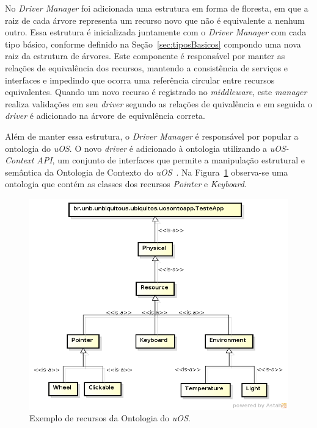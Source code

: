 No \emph{Driver Manager} foi adicionada uma estrutura em forma de floresta, em que a raiz de cada árvore representa um recurso novo que não é equivalente a nenhum outro. Essa estrutura é inicializada juntamente com o \emph{Driver Manager} com cada tipo básico, conforme definido na Seção~\ref{sec:tiposBasicos} compondo uma nova raiz da estrutura de árvores. Este componente é responsável por manter as relações de equivalência dos recursos, mantendo a consistência de serviços e interfaces e impedindo que ocorra uma referência circular entre recursos equivalentes. Quando um novo recurso é registrado no \emph{middleware}, este \emph{manager} realiza validações em seu \emph{driver} segundo as relações de quivalência e em seguida o \emph{driver} é adicionado na árvore de equivalência correta. 

Além de manter essa estrutura, o \emph{Driver Manager} é responsável por popular a ontologia do \emph{uOS}. O novo \emph{driver} é adicionado à ontologia utilizando a \emph{uOS-Context API}, um conjunto de interfaces que permite a manipulação estrutural e semântica da Ontologia de Contexto do \emph{uOS}~\cite{ozakisbcup2011}. Na Figura~\ref{fig:ontologiaUOS} observa-se uma ontologia que contém as classes dos recursos \emph{Pointer} e \emph{Keyboard}.

\begin{figure}[ht]
	\center
	\includegraphics[scale=0.7]{imagens/ontologia}
	\caption{Exemplo de recursos da Ontologia do \emph{uOS}.}
	\label{fig:ontologiaUOS}
\end{figure}

